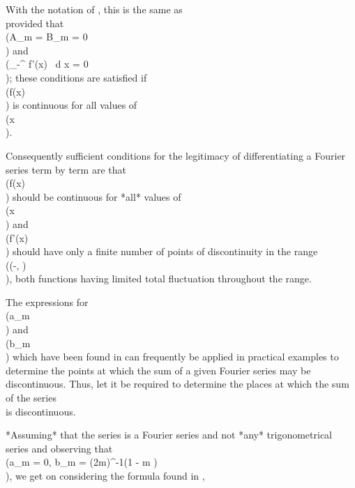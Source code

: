 With the notation of , this is the same as
\\[ 
\frac{1}{2} a_{0}'
+
\sum_{m=1}^{\infty} ( a_{m}' \cos mx + b_{m}' \sin mx),
\\] 
provided that \\(A_{m} = B_{m} = 0\\) and
\\(\int_{-\pi}^{\pi} f'(x) \, d x = 0\\);
these conditions are satisfied if \\(f(x)\\) is continuous for all values of
\\(x\\).

Consequently sufficient conditions for the legitimacy of
differentiating a Fourier series term by term are that \\(f(x)\\) should be
continuous for *all* values of \\(x\\) and \\(f'(x)\\) should have only a finite
number of points of discontinuity in the range \\((-\pi, \pi)\\), both
functions having limited total fluctuation throughout the range.


The expressions for \\(a_{m}\\) and \\(b_{m}\\) which have been found in
 can
frequently be applied in practical examples to determine the points
at which the sum of a given Fourier series may be discontinuous. Thus,
let it be required to determine the places at which the sum of the
series
\\[ 
\sin x
+ \frac{1}{3} \sin 3x
+ \frac{1}{5} \sin 5x
+ \cdots
\\] 
is discontinuous.

*Assuming* that the series is a Fourier series and not *any*
trigonometrical series and observing that
\\(a_{m} = 0, b_{m} = (2m)^{-1}(1 - \cos m \pi)\\), we get on considering the
formula found in ,
\\[ 
A_{m} = 0,
\quad
B_{m} = \frac{1}{2} - \frac{1}{2} \cos m \pi,
\quad
a_{m}' = b_{m}' = 0.
\\] 

